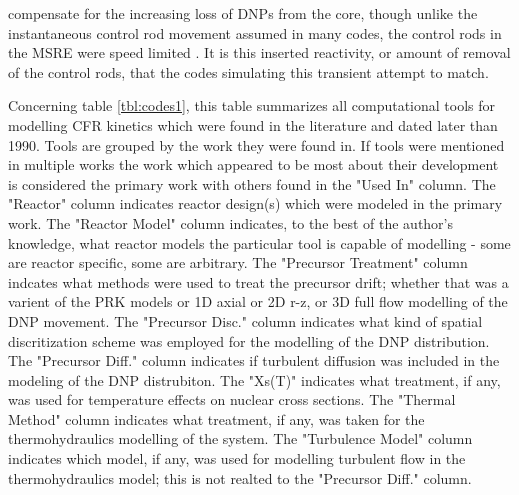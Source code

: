 \documentclass[review]{elsarticle}
\begin{document}
compensate for the increasing loss of DNPs from the core, though unlike the
instantaneous control rod movement assumed in many codes, 
the control rods in the
MSRE were speed limited \cite{krepel_dyn3d-msr_2007}. It is this inserted
reactivity, or amount of removal of the control rods, that the codes simulating
this transient attempt to match.
\par Concerning table \ref{tbl:codes1}, this table summarizes all computational
tools for modelling CFR kinetics which were
found in the literature and dated later than 1990. Tools are grouped by the
work they were found in. If tools were mentioned in multiple works the
work which appeared to be most about their development is considered
the primary work with others found in the "Used In" column. The
"Reactor" column indicates reactor design(s) which were modeled in
the primary work. The "Reactor Model" column indicates, to the best
of the author's knowledge, what reactor models the particular tool is
capable of modelling - some are reactor specific, some are arbitrary.
The "Precursor Treatment" column indcates what methods were used to
treat the precursor drift; whether that was a varient of the PRK models
or 1D axial or 2D r-z, or 3D full flow modelling of the DNP movement.
The "Precursor Disc." column indicates what kind of spatial
discritization scheme was employed for the modelling of the DNP distribution.
The "Precursor Diff." column indicates if turbulent diffusion was included in
the modeling of the DNP distrubiton. The "Xs(T)" indicates what treatment, if
any, was used for temperature effects on nuclear cross sections. The
"Thermal Method" column indicates what treatment, if any, was taken for the
thermohydraulics modelling of the system. The "Turbulence Model" column
indicates which model, if any, was used for modelling turbulent flow in the
thermohydraulics model; this is not realted to the "Precursor Diff." column.
\end{document}
